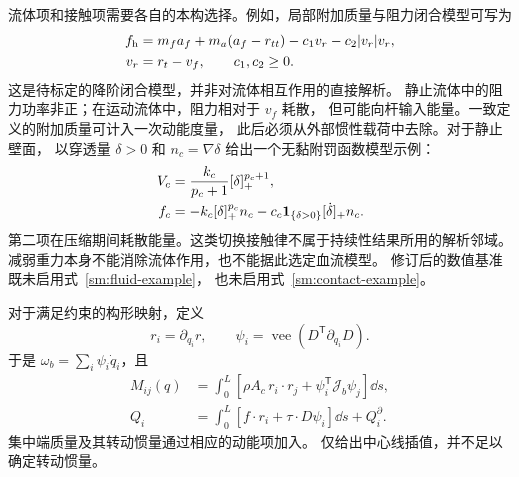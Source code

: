 流体项和接触项需要各自的本构选择。例如，局部附加质量与阻力闭合模型可写为
\begin{align}
 f_{\rm h}&=m_f a_f+m_a(a_f-r_{tt})
                  -c_1v_r-c_2|v_r|v_r,\nonumber\\
 v_r&=r_t-v_f,\qquad c_1,c_2\ge0.
 \label{sm:fluid-example}
\end{align}
这是待标定的降阶闭合模型，并非对流体相互作用的直接解析。
静止流体中的阻力功率非正；在运动流体中，阻力相对于 $v_f$ 耗散，
但可能向杆输入能量。一致定义的附加质量可计入一次动能度量，
此后必须从外部惯性载荷中去除。对于静止壁面，
以穿透量 $\delta>0$ 和 $n_c=\nabla\delta$ 给出一个无黏附罚函数模型示例：
\begin{align}
 V_c&=\frac{k_c}{p_c+1}[\delta]_+^{p_c+1},\nonumber\\
 f_c&=-k_c[\delta]_+^{p_c}n_c
       -c_c{\bf1}_{\{\delta>0\}}[\dot\delta]_+n_c.
 \label{sm:contact-example}
\end{align}
第二项在压缩期间耗散能量。这类切换接触律不属于持续性结果所用的解析邻域。
减弱重力本身不能消除流体作用，也不能据此选定血流模型。
修订后的数值基准既未启用式~\eqref{sm:fluid-example}，
也未启用式~\eqref{sm:contact-example}。

对于满足约束的构形映射，定义
\begin{equation}
 r_i=\partial_{q_i}r,\qquad
 \psi_i=\operatorname{vee}(D^{\mathsf T}\partial_{q_i}D).
 \label{sm:configuration-derivatives}
\end{equation}
于是 $\omega_b=\sum_i\psi_i\dot q_i$，且
\begin{align}
 M_{ij}(q)&=\int_0^L
     [\rho A_c\,r_i\cdot r_j+\psi_i^{\mathsf T}\mathcal J_b\psi_j]\dd s,
       \nonumber\\
 Q_i&=\int_0^L[f\cdot r_i+\tau\cdot D\psi_i]\dd s+Q_i^\partial.
 \label{sm:galerkin-metric}
\end{align}
集中端质量及其转动惯量通过相应的动能项加入。
仅给出中心线插值，并不足以确定转动惯量。

